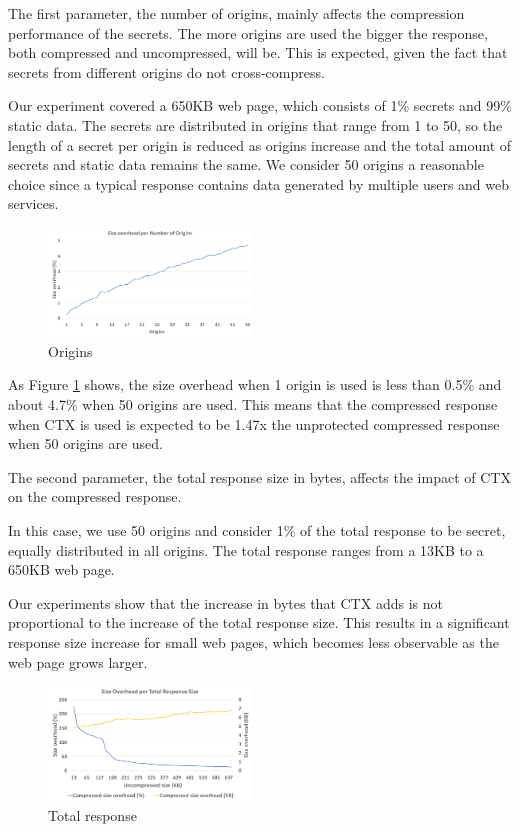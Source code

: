 \documentclass[conference, letterpaper, 10pt]{IEEEtran}
\begin{document}
The first parameter, the number of origins, mainly affects the compression
performance of the secrets. The more origins are used the bigger the response,
both compressed and uncompressed, will be. This is expected, given the fact that
secrets from different origins do not cross-compress.

Our experiment covered a 650KB web page, which consists of 1\% secrets and 99\%
static data. The secrets are distributed in origins that range from 1 to 50, so
the length of a secret per origin is reduced as origins increase and the total
amount of secrets and static data remains the same. We consider 50 origins a
reasonable choice since a typical response contains data generated by multiple
users and web services.

    \begin{figure}[thpb]
        \centering
            \includegraphics[width=0.48\textwidth]{experiments/origins.png}
        \caption{Origins}
        \label{fig:origin_ctx}
    \end{figure}

As Figure \ref{fig:origin_ctx} shows, the size overhead when 1 origin is used is less than 0.5\%
and about 4.7\% when 50 origins are used. This means that the compressed
response when CTX is used is expected to be 1.47x the unprotected compressed
response when 50 origins are used.

The second parameter, the total response size in bytes, affects the impact of
CTX on the compressed response.

In this case, we use 50 origins and consider 1\% of the total response to be
secret, equally distributed in all origins. The total response ranges from a
13KB to a 650KB web page.

Our experiments show that the increase in bytes that CTX adds is not
proportional to the increase of the total response size. This results in a
significant response size increase for small web pages, which becomes less
observable as the web page grows larger.

    \begin{figure}[thpb]
        \centering
            \includegraphics[width=0.48\textwidth]{experiments/total_response.png}
        \caption{Total response}
        \label{fig:total_response_ctx}
    \end{figure}
\end{document}
